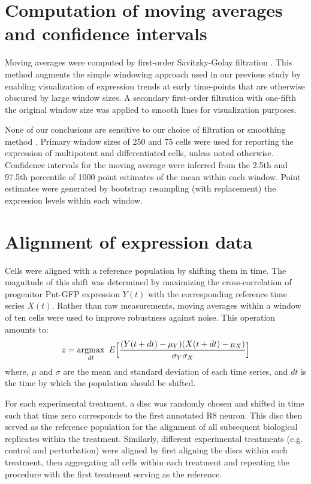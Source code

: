 \section{Computation of moving averages and confidence intervals}
\label{appendix:ratio:moving_averages}

Moving averages were computed by first-order Savitzky-Golay filtration \cite{Savitzky1964}. This method augments the simple windowing approach used in our previous study \cite{Pelaez2015a} by enabling visualization of expression trends at early time-points that are otherwise obscured by large window sizes. A secondary first-order filtration with one-fifth the original window size was applied to smooth lines for visualization purposes.

None of our conclusions are sensitive to our choice of filtration or smoothing method \cite{Pelaez2015a}. Primary window sizes of 250 and 75 cells were used for reporting the expression of multipotent and differentiated cells, unless noted otherwise. Confidence intervals for the moving average were inferred from the 2.5th and 97.5th percentile of 1000 point estimates of the mean within each window. Point estimates were generated by bootstrap resampling (with replacement) the expression levels within each window.

\section{Alignment of expression data}
\label{appendix:ratio:alignment}

Cells were aligned with a reference population by shifting them in time. The magnitude of this shift was determined by maximizing the cross-correlation of progenitor Pnt-GFP expression $Y(t)$ with the corresponding reference time series $X(t)$. Rather than raw measurements, moving averages within a window of ten cells were used to improve robustness against noise. This operation amounts to:
\begin{equation}
z = \operatorname*{\arg\!\max}_{dt} \ { E \Big[ \frac{(Y(t+dt)-\mu_Y)(X(t+dt)-\mu_X)}{\sigma_Y \sigma_X} \Big] }
\end{equation}
where, $\mu$ and $\sigma$ are the mean and standard deviation of each time series, and $dt$ is the time by which the population should be shifted.

For each experimental treatment, a disc was randomly chosen and shifted in time such that time zero corresponds to the first annotated R8 neuron. This disc then served as the reference population for the alignment of all subsequent biological replicates within the treatment. Similarly, different experimental treatments (e.g. control and perturbation) were aligned by first aligning the discs within each treatment, then aggregating all cells within each treatment and repeating the procedure with the first treatment serving as the reference.

